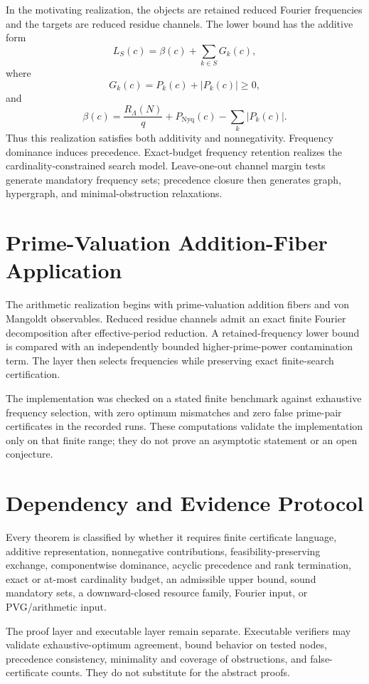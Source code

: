 \documentclass[11pt]{article}
\theoremstyle{definition}
\theoremstyle{remark}
\newcommand{\COF}{\mathrm{COF}}
\begin{document}
In the motivating realization, the objects are retained reduced Fourier frequencies and the targets are reduced residue channels. The lower bound has the additive form
\[
L_S(c)=\beta(c)+\sum_{k\in S}G_k(c),
\]
where
\[
G_k(c)=P_k(c)+|P_k(c)|\ge0,
\]
and
\[
\beta(c)
=
\frac{R_\Lambda(N)}q
+P_{\mathrm{Nyq}}(c)
-\sum_k|P_k(c)|.
\]
Thus this realization satisfies both additivity and nonnegativity. Frequency dominance induces precedence. Exact-budget frequency retention realizes the cardinality-constrained search model. Leave-one-out channel margin tests generate mandatory frequency sets; precedence closure then generates graph, hypergraph, and minimal-obstruction relaxations.

\section{Prime-Valuation Addition-Fiber Application}

The arithmetic realization begins with prime-valuation addition fibers and von Mangoldt observables. Reduced residue channels admit an exact finite Fourier decomposition after effective-period reduction. A retained-frequency lower bound is compared with an independently bounded higher-prime-power contamination term. The \COF{} layer then selects frequencies while preserving exact finite-search certification.

The implementation was checked on a stated finite benchmark against exhaustive frequency selection, with zero optimum mismatches and zero false prime-pair certificates in the recorded runs. These computations validate the implementation only on that finite range; they do not prove an asymptotic statement or an open conjecture.

\section{Dependency and Evidence Protocol}

Every theorem is classified by whether it requires finite certificate language, additive representation, nonnegative contributions, feasibility-preserving exchange, componentwise dominance, acyclic precedence and rank termination, exact or at-most cardinality budget, an admissible upper bound, sound mandatory sets, a downward-closed resource family, Fourier input, or PVG/arithmetic input.

The proof layer and executable layer remain separate. Executable verifiers may validate exhaustive-optimum agreement, bound behavior on tested nodes, precedence consistency, minimality and coverage of obstructions, and false-certificate counts. They do not substitute for the abstract proofs.
\end{document}
